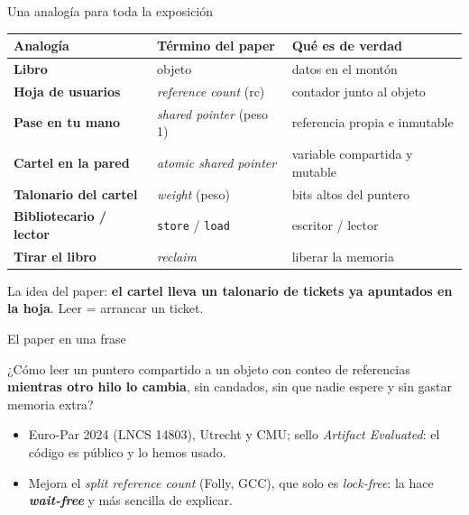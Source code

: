 \documentclass[aspectratio=169,11pt]{beamer}
\newcommand{\clave}[1]{\textcolor{acento}{\textbf{#1}}}
\newcommand{\elexpositor}{}
\newcommand{\expone}[1]{\renewcommand{\elexpositor}{#1}}
\begin{document}
\begin{frame}{Una analogía para toda la exposición}
  \renewcommand{\arraystretch}{1.1}\small
  \begin{tabularx}{\linewidth}{@{}>{\bfseries}p{4.2cm} p{4.6cm} X@{}}
    \toprule
    Analogía & Término del paper & Qué es de verdad\\
    \midrule
    Libro & objeto & datos en el montón\\
    \textcolor{hoja}{Hoja} de usuarios & \emph{reference count} (rc) & contador junto al objeto\\
    Pase en tu mano & \emph{shared pointer} (peso 1) & referencia propia e inmutable\\
    \textcolor{acento}{Cartel} en la pared & \emph{atomic shared pointer} & variable compartida y mutable\\
    \textcolor{acento}{Talonario} del cartel & \emph{weight} (peso) & bits altos del puntero\\
    Bibliotecario / lector & \texttt{store} / \texttt{load} & escritor / lector\\
    Tirar el libro & \emph{reclaim} & liberar la memoria\\
    \bottomrule
  \end{tabularx}
  \vfill
  \begin{center}\small La idea del paper: \clave{el cartel lleva un talonario de tickets ya apuntados en la hoja}. Leer = arrancar un ticket.\end{center}
\end{frame}

\expone{David}

\begin{frame}{El paper en una frase}
  \begin{block}{}
    \large ¿Cómo leer un puntero compartido a un objeto con conteo de referencias \textbf{mientras otro hilo lo cambia}, sin candados, sin que nadie espere y sin gastar memoria extra?
  \end{block}
  \bigskip
  \begin{itemize}
    \item Euro-Par 2024 (LNCS 14803), Utrecht y CMU; sello \emph{Artifact Evaluated}: el código es público y lo hemos usado.
    \item Mejora el \emph{split reference count} (Folly, GCC), que solo es \emph{lock-free}: la hace \textbf{\emph{wait-free}} y más sencilla de explicar.
  \end{itemize}
\end{frame}
\end{document}
